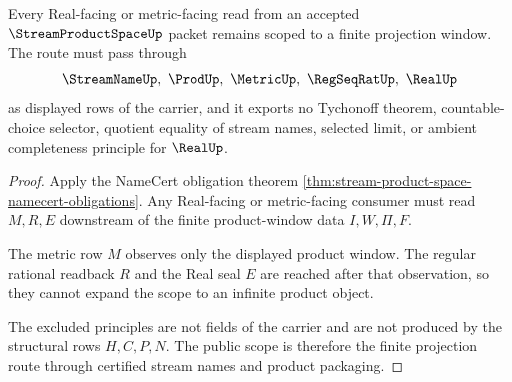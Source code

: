 \begin{theorem}
\label{thm:stream-product-space-finite-projection-scope}
Every Real-facing or metric-facing read from an accepted $\StreamProductSpaceUp$ packet remains scoped to a finite projection window. The route must pass through
$$
\StreamNameUp,\ \ProdUp,\ \MetricUp,\ \RegSeqRatUp,\ \RealUp
$$
as displayed rows of the carrier, and it exports no Tychonoff theorem, countable-choice selector, quotient equality of stream names, selected limit, or ambient completeness principle for $\RealUp$.
\end{theorem}
\begin{proof}
Apply the NameCert obligation theorem \autoref{thm:stream-product-space-namecert-obligations}. Any Real-facing or metric-facing consumer must read $M,R,E$ downstream of the finite product-window data $I,W,\Pi,F$.

The metric row $M$ observes only the displayed product window. The regular rational readback $R$ and the Real seal $E$ are reached after that observation, so they cannot expand the scope to an infinite product object.

The excluded principles are not fields of the carrier and are not produced by the structural rows $H,C,P,N$. The public scope is therefore the finite projection route through certified stream names and product packaging.
\end{proof}




